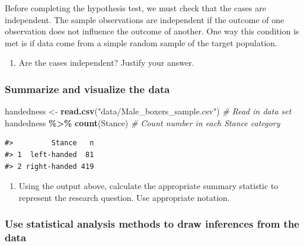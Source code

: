 \documentclass[
]{report}
\newenvironment{Shaded}{\begin{snugshade}}{\end{snugshade}}
\newcommand{\CommentTok}[1]{\textcolor[rgb]{0.56,0.35,0.01}{\textit{#1}}}
\newcommand{\KeywordTok}[1]{\textcolor[rgb]{0.13,0.29,0.53}{\textbf{#1}}}
\newcommand{\NormalTok}[1]{#1}
\newcommand{\OperatorTok}[1]{\textcolor[rgb]{0.81,0.36,0.00}{\textbf{#1}}}
\newcommand{\StringTok}[1]{\textcolor[rgb]{0.31,0.60,0.02}{#1}}
\providecommand{\tightlist}{%
  \setlength{\itemsep}{0pt}\setlength{\parskip}{0pt}}
\begin{document}
Before completing the hypothesis test, we must check that the cases are independent. The sample observations are independent if the outcome of one observation does not influence the outcome of another. One way this condition is met is if data come from a simple random sample of the target population.

\begin{enumerate}
\def\labelenumi{\arabic{enumi}.}
\setcounter{enumi}{5}
\tightlist
\item
  Are the cases independent? Justify your answer.
\end{enumerate}

\vspace{1in}

\hypertarget{summarize-and-visualize-the-data}{%
\subsubsection*{Summarize and visualize the data}\label{summarize-and-visualize-the-data}}

\begin{Shaded}
\begin{Highlighting}[]
\NormalTok{handedness \textless{}{-}}\StringTok{ }\KeywordTok{read.csv}\NormalTok{(}\StringTok{"data/Male\_boxers\_sample.csv"}\NormalTok{) }\CommentTok{\# Read in data set}
\NormalTok{handedness }\OperatorTok{\%\textgreater{}\%}\StringTok{ }\KeywordTok{count}\NormalTok{(Stance)  }\CommentTok{\# Count number in each Stance category}
\end{Highlighting}
\end{Shaded}

\begin{verbatim}
#>         Stance   n
#> 1  left-handed  81
#> 2 right-handed 419
\end{verbatim}

\begin{enumerate}
\def\labelenumi{\arabic{enumi}.}
\setcounter{enumi}{6}
\tightlist
\item
  Using the output above, calculate the appropriate summary statistic to represent the research question. Use appropriate notation.
\end{enumerate}

\vspace{0.5in}

\hypertarget{use-statistical-analysis-methods-to-draw-inferences-from-the-data}{%
\subsubsection*{Use statistical analysis methods to draw inferences from the data}\label{use-statistical-analysis-methods-to-draw-inferences-from-the-data}}
\end{document}
